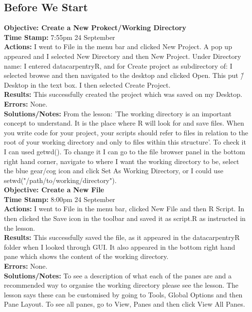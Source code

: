 \documentclass{article}
\begin{document}
\begin{FlushLeft}
\subsection{Before We Start}
\textbf{Objective: Create a New Prokect/Working Directory}\\ 
\textbf{Time Stamp:} 7:55pm 24 September\\
\textbf{Actions:} I went to File in the menu bar and clicked New Project. A pop up appeared and I selected New Directory and then New Project. Under Directory name: I entered data\textunderscore carpentry\textunderscore R, and for Create project as subdirectory of: I selected browse and then navigated to the desktop and clicked Open. This put \~/Desktop in the text box. I then selected Create Project. \\
\textbf{Results:} This successfully created the project which was saved on my Desktop.\\
\textbf{Errors:} None.\\
\textbf{Solutions/Notes:} From the lesson: 'The working directory is an important concept to understand. It is the place where R will look for and save files. When you write code for your project, your scripts should refer to files in relation to the root of your working directory and only to files within this structure'. To check it I can used getwd(). To change it I can go to the file browser panel in the bottom right hand corner, navigate to where I want the working directory to be, select the blue gear/cog icon and click Set As Working Directory, or I could use setwd("/path/to/working/directory").\\
\vspace{5mm}
\textbf{Objective: Create a New File}\\ 
\textbf{Time Stamp:} 8:00pm 24 September\\
\textbf{Actions:} I went to File in the menu bar, clicked New File and then R Script. In then clicked the Save icon in the toolbar and saved it as script.R as instructed in the lesson.\\
\textbf{Results:} This successfully saved the file, as it appeared in the data\textunderscore carpentry\textunderscore R folder when I looked through GUI. It also appeared in the bottom right hand pane which shows the content of the working directory.\\
\textbf{Errors:} None.\\
\textbf{Solutions/Notes:} To see a description of what each of the panes are and a recommended way to organise the working directory please see the lesson. The lesson says these can be customised by going to Tools, Global Options and then Pane Layout. To see all panes, go to View, Panes and then click View All Panes.\\

\end{FlushLeft}
\end{document}

